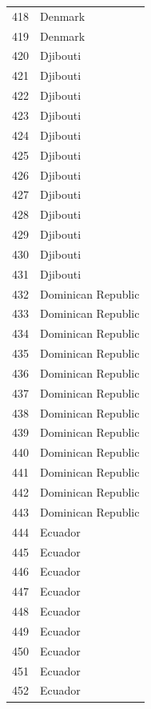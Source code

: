\documentclass[
  letterpaper,
  DIV=11,
  numbers=noendperiod]{scrreprt}
\begin{document}
\begin{tabular}{ll}
418  &                   Denmark \\
419  &                   Denmark \\
420  &                  Djibouti \\
421  &                  Djibouti \\
422  &                  Djibouti \\
423  &                  Djibouti \\
424  &                  Djibouti \\
425  &                  Djibouti \\
426  &                  Djibouti \\
427  &                  Djibouti \\
428  &                  Djibouti \\
429  &                  Djibouti \\
430  &                  Djibouti \\
431  &                  Djibouti \\
432  &        Dominican Republic \\
433  &        Dominican Republic \\
434  &        Dominican Republic \\
435  &        Dominican Republic \\
436  &        Dominican Republic \\
437  &        Dominican Republic \\
438  &        Dominican Republic \\
439  &        Dominican Republic \\
440  &        Dominican Republic \\
441  &        Dominican Republic \\
442  &        Dominican Republic \\
443  &        Dominican Republic \\
444  &                   Ecuador \\
445  &                   Ecuador \\
446  &                   Ecuador \\
447  &                   Ecuador \\
448  &                   Ecuador \\
449  &                   Ecuador \\
450  &                   Ecuador \\
451  &                   Ecuador \\
452  &                   Ecuador \\

\end{tabular}
\end{document}
